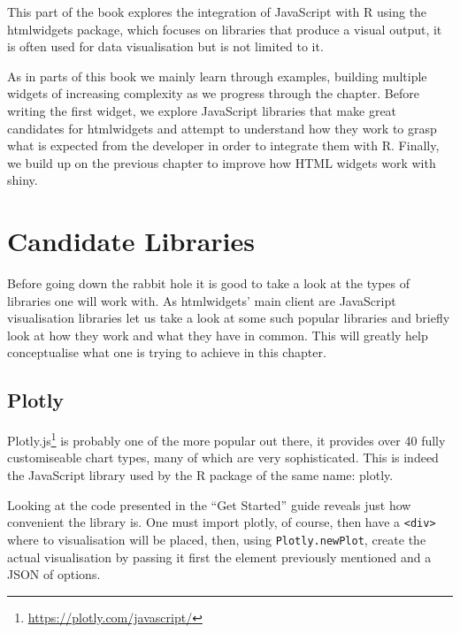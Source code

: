 \documentclass[
]{krantz}
\renewcommand{\href}[2]{#2\footnote{\url{#1}}}
\begin{document}
This part of the book explores the integration of JavaScript with R using the htmlwidgets package, which focuses on libraries that produce a visual output, it is often used for data visualisation but is not limited to it.

As in parts of this book we mainly learn through examples, building multiple widgets of increasing complexity as we progress through the chapter. Before writing the first widget, we explore JavaScript libraries that make great candidates for htmlwidgets and attempt to understand how they work to grasp what is expected from the developer in order to integrate them with R. Finally, we build up on the previous chapter to improve how HTML widgets work with shiny.

\hypertarget{candidate-libraries}{%
\section*{Candidate Libraries}\label{candidate-libraries}}


Before going down the rabbit hole it is good to take a look at the types of libraries one will work with. As htmlwidgets' main client are JavaScript visualisation libraries let us take a look at some such popular libraries and briefly look at how they work and what they have in common. This will greatly help conceptualise what one is trying to achieve in this chapter.

\hypertarget{plotly}{%
\subsection*{Plotly}\label{plotly}}


\href{https://plotly.com/javascript/}{Plotly.js} is probably one of the more popular out there, it provides over 40 fully customiseable chart types, many of which are very sophisticated. This is indeed the JavaScript library used by the R package of the same name: plotly.

Looking at the code presented in the ``Get Started'' guide reveals just how convenient the library is. One must import plotly, of course, then have a \texttt{\textless{}div\textgreater{}} where to visualisation will be placed, then, using \texttt{Plotly.newPlot}, create the actual visualisation by passing it first the element previously mentioned and a JSON of options.
\end{document}
